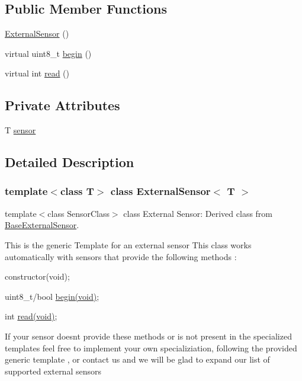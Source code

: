 \subsection*{Public Member Functions}
\begin{DoxyCompactItemize}
\item 
\hyperlink{classExternalSensor_a8b991447fba33253103d06198b838751}{External\+Sensor} ()
\item 
virtual uint8\+\_\+t \hyperlink{classExternalSensor_ab6fe1379d55b656a048e0fba1e0a32e6}{begin} ()
\item 
virtual int \hyperlink{classExternalSensor_a6dbf2d6b1c183740ce0f153d6e43ccb2}{read} ()
\end{DoxyCompactItemize}
\subsection*{Private Attributes}
\begin{DoxyCompactItemize}
\item 
T \hyperlink{classExternalSensor_a6e1f518119abe08c14b498ce24a7e1b3}{sensor}
\end{DoxyCompactItemize}


\subsection{Detailed Description}
\subsubsection*{template$<$class T$>$\newline
class External\+Sensor$<$ T $>$}

template$<$class Sensor\+Class$>$ class External Sensor\+: Derived class from \hyperlink{classBaseExternalSensor}{Base\+External\+Sensor}. 

This is the generic Template for an external sensor This class works automatically with sensors that provide the following methods \+:
\begin{DoxyItemize}
\item constructor(void);
\item uint8\+\_\+t/bool \hyperlink{classExternalSensor_ab6fe1379d55b656a048e0fba1e0a32e6}{begin(void)};
\item int \hyperlink{classExternalSensor_a6dbf2d6b1c183740ce0f153d6e43ccb2}{read(void)};
\end{DoxyItemize}

If your sensor doesn\textquotesingle{}t provide these methods or is not present in the specialized templates feel free to implement your own specializiation, following the provided generic template , or contact us and we will be glad to expand our list of supported external sensors 

